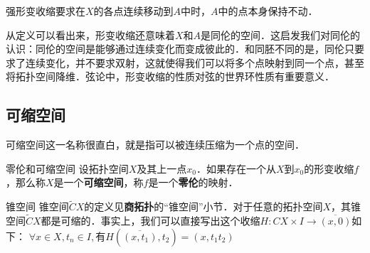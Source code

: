 强形变收缩要求在$X$的各点连续移动到$A$中时，$A$中的点本身保持不动．

从定义可以看出来，形变收缩还意味着$X$和$A$是同伦的空间．这启发我们对同伦的认识：同伦的空间是能够通过连续变化而变成彼此的．和同胚不同的是，同伦只要求了连续变化，并不要求双射，这就使得我们可以将多个点映射到同一个点，甚至将拓扑空间降维．弦论中，形变收缩的性质对弦的世界环性质有重要意义．

\subsection{可缩空间}
可缩空间这一名称很直白，就是指可以被连续压缩为一个点的空间．

\begin{definition}{零伦和可缩空间}
设拓扑空间$X$及其上一点$x_0$．如果存在一个从$X$到$x_0$的形变收缩$f$，那么称$X$是一个\textbf{可缩空间}，称$f$是一个\textbf{零伦}的映射．
\end{definition}

\begin{example}{锥空间}
锥空间$\widetilde{C}X$的定义见\textbf{商拓扑}的“锥空间”小节．对于任意的拓扑空间$X$，其锥空间$\widetilde{C}X$都是可缩的．事实上，我们可以直接写出这个收缩$H:CX\times I\rightarrow\overline{(x, 0)}$如下：
$\forall x\in X, t_n\in I, $有$H(\overline{(x, t_1)}, t_2)=(x, t_1t_2)$
\end{example}


